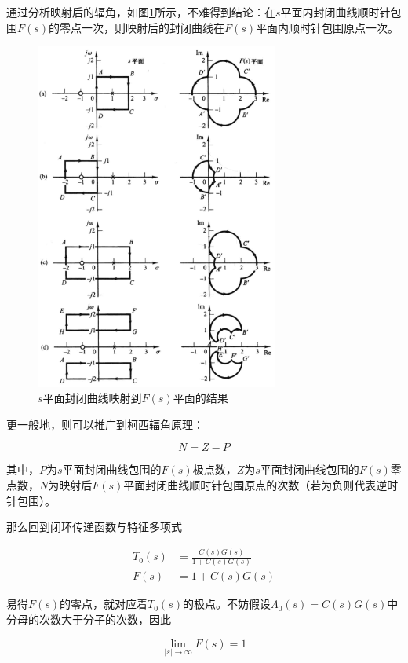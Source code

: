通过分析映射后的辐角，如图\ref{24}所示，不难得到结论：在$s$平面内封闭曲线顺时针包围$F(s)$的零点一次，则映射后的封闭曲线在$F(s)$平面内顺时针包围原点一次。

\begin{figure}[!ht]
    \centering
    \includegraphics[width=8cm]{figures/24.png}
    \caption{$s$平面封闭曲线映射到$F(s)$平面的结果}
    \label{24}
\end{figure}

更一般地，则可以推广到柯西辐角原理：

\begin{equation*}
    N=Z-P
\end{equation*}

其中，$P$为$s$平面封闭曲线包围的$F(s)$极点数，$Z$为$s$平面封闭曲线包围的$F(s)$零点数，$N$为映射后$F(s)$平面封闭曲线顺时针包围原点的次数（若为负则代表逆时针包围）。

那么回到闭环传递函数与特征多项式

\begin{align*}
    T_0(s)&=\frac{C(s)G(s)}{1+C(s)G(s)}\\ 
    F(s)&=1+C(s)G(s)
\end{align*}

易得$F(s)$的零点，就对应着$T_0(s)$的极点。不妨假设$\Lambda_0(s)=C(s)G(s)$中分母的次数大于分子的次数，因此

\begin{equation*}
    \lim_{|s|\rightarrow\infty}F(s)=1
\end{equation*}

